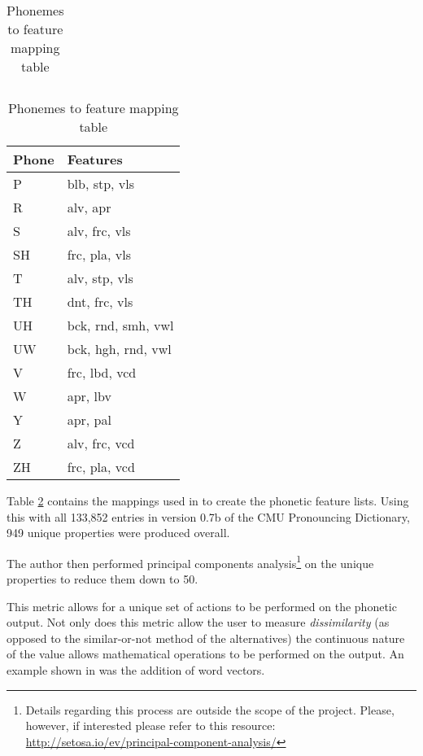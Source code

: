 \begin{table}[!htb]
\begin{minipage}{.33\linewidth}
\begin{tabular}{ll}
        \end{tabular}
    \end{minipage} 
    \begin{minipage}{.33\linewidth}
        \centering
        \begin{tabular}{ll}
            Phone & Features \\
            \hline
            P & blb, stp, vls \\
            R & alv, apr \\
            S & alv, frc, vls \\
            SH & frc, pla, vls \\
            T & alv, stp, vls \\
            TH & dnt, frc, vls \\
            UH & bck, rnd, smh, vwl \\
            UW & bck, hgh, rnd, vwl \\
            V & frc, lbd, vcd \\
            W & apr, lbv \\
            Y & apr, pal \\
            Z & alv, frc, vcd \\
            ZH & frc, pla, vcd \\
        \end{tabular}
    \end{minipage} 
    \caption{Phonemes to feature mapping table}
    \label{tab:features}
\end{table}

Table \ref{tab:features} contains the mappings used in \cite{parrish2017poetic} to create the phonetic feature lists.
Using this with all 133,852 entries in version 0.7b of the CMU Pronouncing Dictionary, 949 unique properties were produced overall. 

The author then performed principal components analysis\footnote{Details regarding this process are outside the scope of the project. Please, however, if interested please refer to this resource: \url{http://setosa.io/ev/principal-component-analysis/}} on the unique properties to reduce them down to 50.

This metric allows for a unique set of actions to be performed on the phonetic output. Not only does this metric allow the user to measure \textit{dissimilarity} (as opposed to the similar-or-not method of the alternatives) the continuous nature of the value allows mathematical operations to be performed on the output. An example shown in \cite{parrish2017poetic} was the addition of word vectors.

